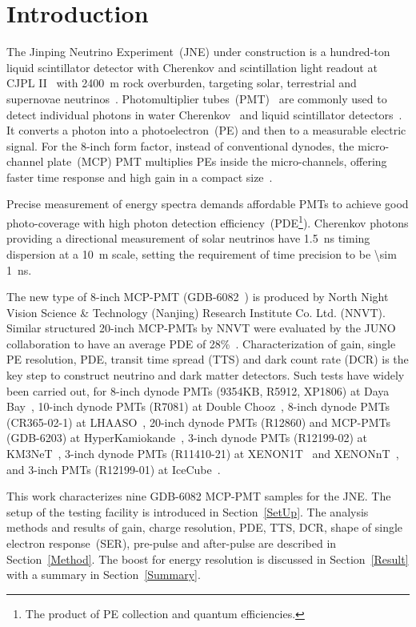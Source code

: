 \section{Introduction}
The Jinping Neutrino Experiment~(JNE) under construction is a hundred-ton liquid scintillator detector with Cherenkov and scintillation light readout
 at CJPL II~\cite{li_second-phase_2015,cheng_china_2017} with \SI{2400}{m} rock overburden, targeting solar, terrestrial and supernovae neutrinos~\cite{LetterJNE2017,xu_jinping_2020,xu_innovations_2022,xu_design_2022}.
Photomultiplier tubes~(PMT)~\cite{HAMAMATSUManual} are commonly used to detect individual photons in water Cherenkov~\cite{SNO,SuperK} and liquid scintillator detectors~\cite{KamLAND,JUNO:2015zny}. It converts a photon into a photoelectron~(PE) and then to a measurable electric signal.  For the 8-inch form factor, instead of conventional dynodes, the micro-channel plate~(MCP) PMT multiplies PEs inside the micro-channels, offering faster time response and high gain in a compact size~\cite{HAMAMATSUManual,WANG2012113,MCP-PMTworkgroup:2021hoy}.

Precise measurement of energy spectra demands affordable PMTs to achieve good photo-coverage with high photon detection efficiency~(PDE\footnote{The product of PE collection and quantum efficiencies.}). Cherenkov photons providing a directional measurement of solar neutrinos have \SI{1.5}{ns} timing dispersion at a \SI{10}{m} scale, setting the requirement of time precision to be \SI{\sim 1}{ns}.


The new type of 8-inch MCP-PMT (GDB-6082~\cite{GDB-6082}) is produced by North Night Vision Science \& Technology (Nanjing) Research Institute Co. Ltd. (NNVT). %
Similar structured 20-inch MCP-PMTs by NNVT were evaluated by the JUNO collaboration to have an average PDE of 28\%~\cite{JUNOMassTesting}.
Characterization of gain, single PE resolution, PDE, transit time spread (TTS) and dark count rate (DCR) is the key step to construct neutrino and dark matter detectors. Such tests have widely been carried out, for 8-inch dynode PMTs (9354KB, R5912, XP1806) at Daya Bay~\cite{DayaBayTesting}, 10-inch dynode PMTs (R7081) at Double Chooz~\cite{DoubleChoozeTesting}, 8-inch dynode PMTs (CR365-02-1) at LHAASO~\cite{LHAASOTesting}, 20-inch dynode PMTs (R12860) and MCP-PMTs (GDB-6203) at HyperKamiokande~\cite{HyperKTesting}, 3-inch dynode PMTs (R12199-02) at KM3NeT~\cite{KM3NetTesting}, 3-inch dynode PMTs (R11410-21) at XENON1T~\cite{XENON1TTesting} and XENONnT~\cite{XENONnTTesting}, and 3-inch PMTs (R12199-01) at IceCube~\cite{IceCubeTesting}.

This work characterizes nine GDB-6082 MCP-PMT samples for the JNE.  The setup of the testing facility is introduced in Section~\ref{SetUp}. The analysis methods and results of gain, charge resolution, PDE, TTS, DCR, shape of single electron response~(SER), pre-pulse and after-pulse are described in Section~\ref{Method}. The boost for energy resolution is discussed in Section~\ref{Result} with a summary in Section~\ref{Summary}.
